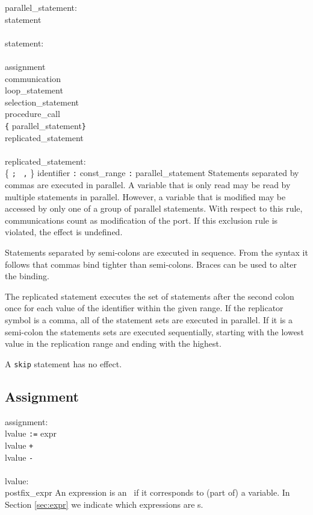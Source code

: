 \grammarstart
parallel\_statement: \\
      \>statement\LIST \\
 \\
statement: \\
        \\
\orbox \>assignment \\
\orbox \>communication \\
\orbox \>loop\_statement \\
\orbox \>selection\_statement \\
\orbox \>procedure\_call \\
\orbox \>\verb|{| parallel\_statement\TSEQ \verb|}| \\
\orbox \>replicated\_statement \\
 \\
replicated\_statement: \\
      \>{\tt{}<<} \{ {\tt{};} \orbox \ {\tt{},} \} identifier {\tt{}:} const\_range {\tt{}:} parallel\_statement\TSEQ {\tt{}>>}
\grammarend
Statements separated by commas are executed in parallel. A variable
that is only read may be read by multiple statements in parallel.
However, a variable that is modified may be accessed by only one of
a group of parallel statements. With respect to this rule, communications
count as modification of the port. If this exclusion rule is violated,
the effect is undefined.

Statements separated by semi-colons are executed in sequence. From
the syntax it follows that commas bind tighter than semi-colons. Braces
can be used to alter the binding.

The replicated statement executes the set of statements after the second
colon once for each value of the identifier within the given range.  If
the replicator symbol is a comma, all of the statement sets are executed
in parallel.  If it is a semi-colon the statements sets are executed
sequentially, starting with the lowest value in the replication range
and ending with the highest.

A {\tt{}skip} statement has no effect.

\subsection{Assignment}\label{sec:assignment}

\grammarstart
assignment: \\
       \>lvalue {\tt{}:=} expr \\
\orbox \>lvalue {\tt{}+} \\
\orbox \>lvalue {\tt{}-} \\
 \\
lvalue: \\
      \>postfix\_expr
\grammarend
An expression is an \lvalue\ if it corresponds to (part of) a variable.
In Section \ref{sec:expr} we indicate which expressions are \lvalue s.

